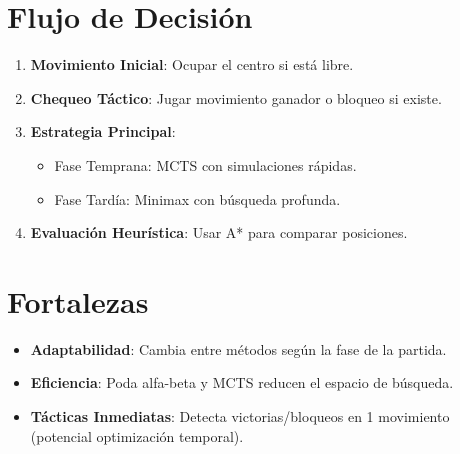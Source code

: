 \documentclass{article}
\begin{document}
\section{Flujo de Decisión}
\begin{enumerate}
\item \textbf{Movimiento Inicial}: Ocupar el centro si está libre.
\item \textbf{Chequeo Táctico}: Jugar movimiento ganador o bloqueo si existe.
\item \textbf{Estrategia Principal}:
\begin{itemize}
\item Fase Temprana: MCTS con simulaciones rápidas.
\item Fase Tardía: Minimax con búsqueda profunda.
\end{itemize}
\item \textbf{Evaluación Heurística}: Usar A* para comparar posiciones.
\end{enumerate}

\section{Fortalezas}
\begin{itemize}
\item \textbf{Adaptabilidad}: Cambia entre métodos según la fase de la partida.
\item \textbf{Eficiencia}: Poda alfa-beta y MCTS reducen el espacio de búsqueda.
\item \textbf{Tácticas Inmediatas}: Detecta victorias/bloqueos en 1 movimiento (potencial optimización temporal).
\end{itemize}
\end{document}
